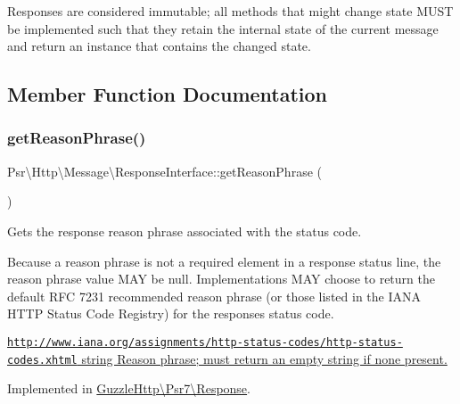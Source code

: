Responses are considered immutable; all methods that might change state M\+U\+ST be implemented such that they retain the internal state of the current message and return an instance that contains the changed state. 

\subsection{Member Function Documentation}
\mbox{\label{interfacePsr_1_1Http_1_1Message_1_1ResponseInterface_a98ae6592ab231946a767d9b422142a26}} 
\subsubsection{\texorpdfstring{get\+Reason\+Phrase()}{getReasonPhrase()}}
{\footnotesize\ttfamily Psr\textbackslash{}\+Http\textbackslash{}\+Message\textbackslash{}\+Response\+Interface\+::get\+Reason\+Phrase (\begin{DoxyParamCaption}{ }\end{DoxyParamCaption})}

Gets the response reason phrase associated with the status code.

Because a reason phrase is not a required element in a response status line, the reason phrase value M\+AY be null. Implementations M\+AY choose to return the default R\+FC 7231 recommended reason phrase (or those listed in the I\+A\+NA H\+T\+TP Status Code Registry) for the response\textquotesingle{}s status code.

\hyperlink{}{\href{http://www.iana.org/assignments/http-status-codes/http-status-codes.xhtml}{\tt http\+://www.\+iana.\+org/assignments/http-\/status-\/codes/http-\/status-\/codes.\+xhtml}  string Reason phrase; must return an empty string if none present. }

Implemented in \hyperlink{classGuzzleHttp_1_1Psr7_1_1Response_a7a7ba26406b18f2353cef4a639fe4be6}{Guzzle\+Http\textbackslash{}\+Psr7\textbackslash{}\+Response}.

\mbox{\label{interfacePsr_1_1Http_1_1Message_1_1ResponseInterface_a599198ec3cc30dc374da26e504c65868}} 
